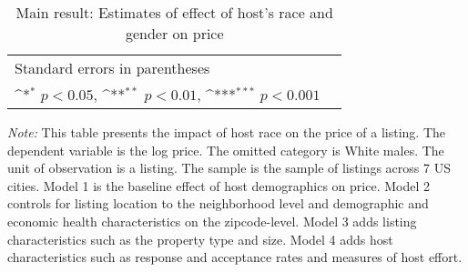 

\newpage


\newpage


\newpage


\newpage

\begin{table}[htbp]\centering
	\def\sym#1{\ifmmode^{#1}\else\(^{#1}\)\fi}
	\caption{Main result: Estimates of effect of host’s race and gender on price}
	\begin{tabular}{l*{5}{c}}
		\hline\hline
		
		\hline\hline
		\multicolumn{5}{l}{\footnotesize Standard errors in parentheses}\\
		\multicolumn{5}{l}{\footnotesize \sym{*} \(p<0.05\), \sym{**} \(p<0.01\), \sym{***} \(p<0.001\)}\\
	\end{tabular}	
\label{table:price}
	\begin{tablenotes}
		
		\item {\it Note:} This table presents the impact of host race on the price of a listing. The dependent variable is the log price. The omitted category is White males. The unit of observation is a listing. The sample is the sample of listings across 7 US cities. Model 1 is the baseline effect of host demographics on price. Model 2 controls for listing location to the neighborhood level and demographic and economic health characteristics on the zipcode-level. Model 3 adds listing characteristics such as the property type and size. Model 4 adds host characteristics such as response and acceptance rates and measures of host effort.  
	\end{tablenotes}
\end{table}



